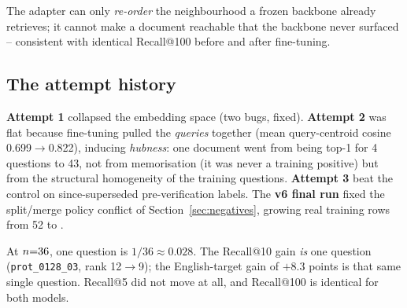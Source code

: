 \documentclass[10pt,a4paper]{article}
\begin{document}
The adapter can only \emph{re-order} the neighbourhood a frozen backbone already retrieves; it cannot make a document reachable that the backbone never surfaced -- consistent with identical Recall@100 before and after fine-tuning.

\subsection{The attempt history}
\begin{table}[H]
\centering

\caption{Fine-tuning attempts against the zero-shot control, with paired-bootstrap 95\% CI on the Recall@10 difference. Rows before 2026-09-15 used pre-verification labels and are listed as history, not evidence.}
\label{tab:fthist}
\end{table}

\textbf{Attempt 1} collapsed the embedding space (two bugs, fixed). \textbf{Attempt 2} was flat because fine-tuning pulled the \emph{queries} together (mean query-centroid cosine 0.699$\to$0.822), inducing \emph{hubness}: one document went from being top-1 for 4 questions to 43, not from memorisation (it was never a training positive) but from the structural homogeneity of the training questions. \textbf{Attempt 3} beat the control on since-superseded pre-verification labels. The \textbf{v6 final run} fixed the split/merge policy conflict of Section~\ref{sec:negatives}, growing real training rows from 52 to \nTrainHuman.

\begin{table}[H]
\centering

\caption{Held-out test ($n{=}\nTest$). Best per column in bold.}
\label{tab:fttest}
\end{table}

\begin{caution}
At $n{=}\nTest$, one question is $1/36\approx0.028$. The Recall@10 gain \emph{is} one question (\texttt{prot\_0128\_03}, rank 12$\to$9); the English-target gain of $+8.3$ points is that same single question. Recall@5 did not move at all, and Recall@100 is identical for both models.
\end{caution}

\begin{table}[H]
\centering

\caption{Question flips between zero-shot and fine-tuned, with and without the \nTestLlm{} LLM-labelled test rows.}
\label{sec:llmsens}
\end{table}
\end{document}

